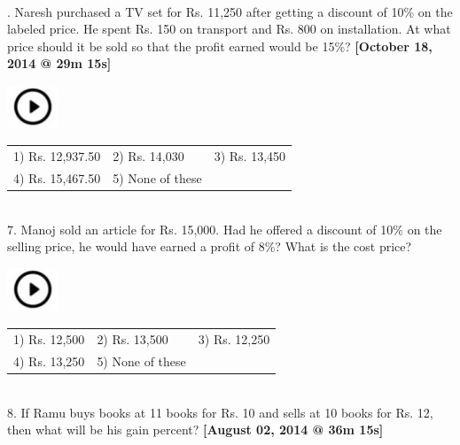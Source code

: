 \documentclass{article}
\begin{document}
	\noindent \\  

.   Naresh purchased a TV set for Rs. 11,250 after getting a discount of 10\% on the labeled price. He spent Rs. 150 on transport and Rs. 800 on installation. At what price should it be sold so that the profit earned would be 15\%?              \textbf{[October 18, 2014 @ 29m 15s]}
	
	\noindent 
	
	\noindent \includegraphics*[width=0.60in, height=0.52in]{images/image1}
 \\ 	\begin{tabular}{p{1.7in} p{1.6in} p{1.6in}} \\ 
 1) Rs. 12,937.50         & 2) Rs. 14,030       & 3) Rs. 13,450       \\
4) Rs. 15,467.50  & 5) None of these \\
\end{tabular}
	
	\noindent 
	
	\noindent 
	
	\noindent 
	
	\noindent \\  7.   Manoj sold an article for Rs. 15,000. Had he offered a discount of 10\% on the selling price, he would have earned a profit of 8\%? What is the cost price?
	
	\noindent \includegraphics*[width=0.60in, height=0.52in]{images/image1}
	\begin{tabular}{p{1.7in} p{1.6in} p{1.6in}} \\ 
 1) Rs. 12,500              & 2) Rs. 13,500       & 3) Rs. 12,250       \\
4) Rs. 13,250       & 5) None of these \\
\end{tabular}
	
	\noindent 
	
\noindent \\ 	8.   If Ramu buys books at 11 books for Rs. 10 and sells at 10 books for Rs. 12, then what will be his gain percent?        \textbf{[August 02, 2014 @ 36m 15s]}
	
\end{document}
